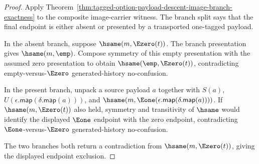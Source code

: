\begin{proof}
Apply Theorem~\ref{thm:tagged-option-payload-descent-image-branch-exactness} to
the composite image-carrier witness. The branch split says that the final
endpoint is either absent or presented by a transported one-tagged payload.

In the absent branch, suppose $\hsame(m,\Ezero(t))$. The branch presentation
gives $\hsame(m,\emp)$. Compose symmetry of this empty presentation with the
assumed zero presentation to obtain $\hsame(\emp,\Ezero(t))$, contradicting
empty-versus-$\Ezero$ generated-history no-confusion.

In the present branch, unpack a source payload $a$ together with $S(a)$,
$U(\epsilon.\mathsf{map}(\delta.\mathsf{map}(a)))$, and
$\hsame(m,\Eone(\epsilon.\mathsf{map}(\delta.\mathsf{map}(a))))$. If
$\hsame(m,\Ezero(t))$ also held, symmetry and transitivity of $\hsame$ would
identify the displayed $\Eone$ endpoint with the zero endpoint, contradicting
$\Eone$-versus-$\Ezero$ generated-history no-confusion.

The two branches both return a contradiction from $\hsame(m,\Ezero(t))$, giving
the displayed endpoint exclusion.
\end{proof}

